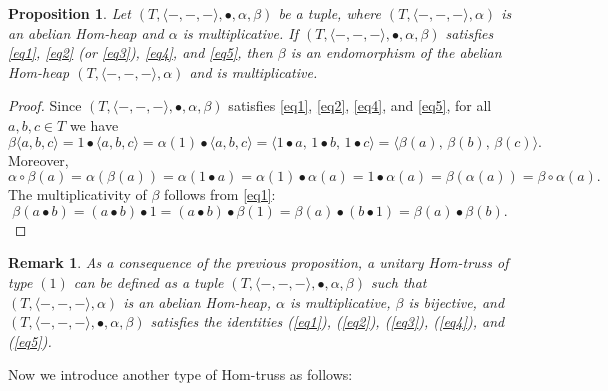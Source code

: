 \documentclass[14pt]{article}
\newtheorem{prop}[thm]{Proposition}
\theoremstyle{Definition}
\newtheorem{Rem}[thm]{Remark}
\theoremstyle{remark}
\begin{document}
\begin{prop}
Let $(T,\langle-,-,-\rangle,\bullet,\alpha,\beta)$ be a tuple, where $(T,\langle-,-,-\rangle,\alpha)$ is an abelian Hom-heap and $\alpha$ is multiplicative.  
If $(T,\langle-,-,-\rangle,\bullet,\alpha,\beta)$ satisfies \eqref{eq1}, \eqref{eq2} (or \eqref{eq3}), \eqref{eq4}, and \eqref{eq5}, then $\beta$ is an endomorphism of the abelian Hom-heap $(T,\langle-,-,-\rangle,\alpha)$ and is multiplicative.
\end{prop}

\begin{proof}
Since $(T,\langle-,-,-\rangle,\bullet,\alpha,\beta)$ satisfies \eqref{eq1}, \eqref{eq2}, \eqref{eq4}, and \eqref{eq5}, for all $a,b,c \in T$ we have  
\[
\beta\langle a,b,c\rangle
= 1 \bullet \langle a,b,c\rangle
= \alpha(1) \bullet \langle a,b,c\rangle
= \langle 1 \bullet a,\, 1 \bullet b,\, 1 \bullet c\rangle
= \langle \beta(a),\, \beta(b),\, \beta(c)\rangle.
\]
Moreover,  
\[
\alpha \circ \beta(a)
= \alpha(\beta(a))
= \alpha(1 \bullet a)
= \alpha(1) \bullet \alpha(a)
= 1 \bullet \alpha(a)
= \beta(\alpha(a))
= \beta \circ \alpha(a).
\]
The multiplicativity of $\beta$ follows from \eqref{eq1}:  
\[
\beta(a \bullet b)
= (a \bullet b) \bullet 1
= (a \bullet b) \bullet \beta(1)
= \beta(a) \bullet (b \bullet 1)
= \beta(a) \bullet \beta(b).
\]
\end{proof}

\begin{Rem}
As a consequence of the previous proposition, a unitary Hom-truss of type $(1)$ can be defined as a tuple $(T,\langle-,-,-\rangle,\bullet,\alpha,\beta)$ such that $(T,\langle-,-,-\rangle,\alpha)$ is an abelian Hom-heap, $\alpha$ is multiplicative, $\beta$ is bijective, and $(T,\langle-,-,-\rangle,\bullet,\alpha,\beta)$ satisfies the identities (\ref{eq1}), (\ref{eq2}), (\ref{eq3}), (\ref{eq4}), and (\ref{eq5}).
\end{Rem}

Now we introduce another type of Hom-truss as follows:
\end{document}
